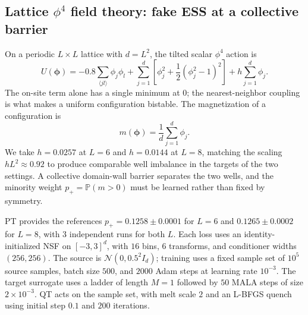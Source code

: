\documentclass{article}
\begin{document}
\subsection{Lattice \texorpdfstring{$\phi^4$}{phi4} field theory: fake ESS at a collective barrier}
\label{subsec: phi4}
On a periodic $L\times L$ lattice with $d=L^2$, the tilted scalar $\phi^4$ action is
\begin{equation*}
U(\boldsymbol\phi)
=-0.8\sum_{\langle jl\rangle}\phi_j\phi_l
+\sum_{j=1}^{d}\left[\phi_j^2+\frac12(\phi_j^2-1)^2\right]
+h\sum_{j=1}^{d}\phi_j.
\end{equation*}
The on-site term alone has a single minimum at $0$; the nearest-neighbor coupling is what makes a uniform configuration bistable. The magnetization of a configuration is
\begin{equation*}
    m(\boldsymbol\phi)=\frac1d\sum_{j=1}^{d}\phi_j .
\end{equation*}
We take $h=0.0257$ at $L=6$ and $h=0.0144$ at $L=8$, matching the scaling $hL^2\approx0.92$ to produce comparable well imbalance in the targets of the two settings.
A collective domain-wall barrier separates the two wells, and the minority weight $p_+=\mathbb P(m>0)$ must be learned rather than fixed by symmetry.

PT provides the references $p_+=0.1258\pm0.0001$ for $L=6$ and $0.1265\pm0.0002$ for $L=8$, with 3 independent runs for both $L$. Each loss uses an identity-initialized NSF on $[-3,3]^d$, with $16$ bins, $6$ transforms, and conditioner widths $(256,256)$. The source is $\mathcal N(0,0.5^2 I_d)$; training uses a fixed sample set of $10^5$ source samples, batch size $500$, and $2000$ Adam steps at learning rate $10^{-3}$. The target surrogate uses a ladder of length $M=1$ followed by $50$ MALA steps of size $2\times10^{-3}$. QT acts on the sample set, with melt scale $2$ and an L-BFGS quench using initial step $0.1$ and $200$ iterations.
\end{document}
